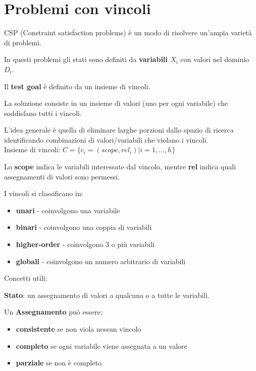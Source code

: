 \newpage

\section{Problemi con vincoli}

CSP (Constraint satisfaction problems) è un modo di risolvere un'ampia
varietà di problemi.

In questi problemi gli stati sono definiti da \textbf{variabili $X_i$} con
valori nel dominio $D_i$.

Il \textbf{test goal} è definito da un insieme di vincoli.

La {soluzione} consiste in un insieme di valori (uno per ogni variabile) che
soddisfano tutti i vincoli.

L'idea generale è quella di eliminare larghe porzioni dallo spazio di ricerca
identificando combinazioni di valori/variabili che violano i vincoli.\\

Insieme di vincoli: $C = \{ c_i = (scope,rel_i) | i=1,...,h\}$

Lo \textbf{scope} indica le variabili interessate dal vincolo, mentre
\textbf{rel} indica quali assegnamenti di valori sono permessi.

I vincoli si classificano in:

\begin{itemize}
 \item \textbf{unari} - coinvolgono una variabile
 \item \textbf{binari} - coinvolgono una coppia di variabili
 \item \textbf{higher-order} - coinvolgono 3 o più variabili
 \item \textbf{globali} - coinvolgono un numero arbitrario di variabili
\end{itemize}

Concetti utili:

\textbf{Stato}: un assegnamento di valori a qualcuna o a tutte le variabili.

Un \textbf{Assegnamento} può essere:

\begin{itemize}
 \item \textbf{consistente} se non viola nessun vincolo
 \item \textbf{completo} se ogni variabile viene assegnata a un valore
 \item \textbf{parziale} se non è completo
\end{itemize}

